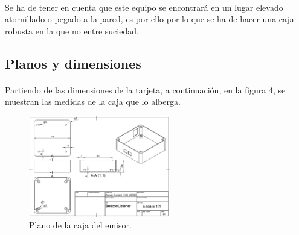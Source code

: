\documentclass[paper=a4, fontsize=11pt,twoside]{scrartcl}
\begin{document}
        \paragraph{}
        Se ha de tener en cuenta que este equipo se encontrará en un lugar elevado atornillado o pegado a la pared, 
        es por ello por lo que se ha de hacer una caja robusta en la que no entre suciedad. 
    \subsection{Planos y dimensiones}
        \paragraph{}
        Partiendo de las dimensiones de la tarjeta, a continuación, en la figura 4, se
        muestran las medidas de la caja que lo alberga. 
        \begin{center}
            \begin{figure}[h]
                \centering
                \includegraphics[width=0.55\textwidth]{../model_master.PNG}
                \caption{Plano de la caja del emisor.}
                \label{fig:mesh1}
            \end{figure}
        \end{center}
        \paragraph{}
        \paragraph{}
\end{document}
